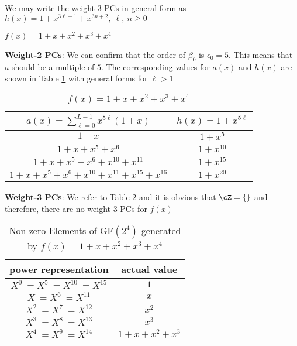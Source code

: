 \begin{example}
We may write the weight-3 PCs in general form as $h(x)=1+x^{3\ell+1}+x^{3n+2},~\ell,~n \geq 0$ 

\label{ex-1}
\end{example}




\begin{example}
$f(x)=1+x+x^2+x^3+x^4$\newline

\textbf{Weight-2 PCs}: 
We can confirm that the order of $\beta_0$ is $\epsilon_0=5$. This means that $a$ should be a multiple of $5$. The corresponding values for $a(x)$ and $h(x)$ are shown in Table \ref{novelTab3} with general forms for $\ell>1$

\begin{table}[htbp]
\caption{$f(x)=1+x+x^2+x^3+x^4$}
\centering
\begin{tabular}{c c} 
 \hline
 $a(x)=\sum_{\ell=0}^{L-1} x^{5\ell}(1+x)$ & $h(x)=1+x^{5\ell}$  \\ [0.5ex] 
 \hline\hline
$1+x$ &$1+x^5$\\ 
$1+x+x^5+x^6$ &$1+x^{10}$  \\
$1+x+x^5+x^6+x^{10}+x^{11}$ & $1+x^{15}$ \\
$1+x+x^5+x^6+x^{10}+x^{11}+x^{15}+x^{16}$ &$1+x^{20}$  
 \end{tabular}
 \label{novelTab3}
\end{table}

\textbf{Weight-3 PCs}:
We refer to Table \ref{novelTabWt3-2} and it is obvious that $\cZ=\{ \}$ and therefore, there are no weight-3 PCs for $f(x)$
 \begin{table}[htbp]
 \caption{Non-zero Elements of GF$(2^4)$ generated by $f(x)=1+x+x^2+x^3+x^4$}
\centering
 \begin{tabular}{c c} 
 \hline
 power representation & actual value \\ [0.5ex] 
 \hline\hline
$X^0~=X^5~=X^{10}~=X^{15}$ & $1$\\
\hline
$X~=X^6~=X^{11}$ & $x$\\
\hline
$X^2~=X^7~=X^{12}$ &  $x^2$\\
\hline
$X^3~=X^8~=X^{13}$ &  $x^3$\\
\hline
$X^4~=X^9~=X^{14}$ &  $1+x+x^2+x^3$\\
\hline
 \end{tabular}
 \label{novelTabWt3-2}
\end{table}
\label{ex-2}
\end{example}

